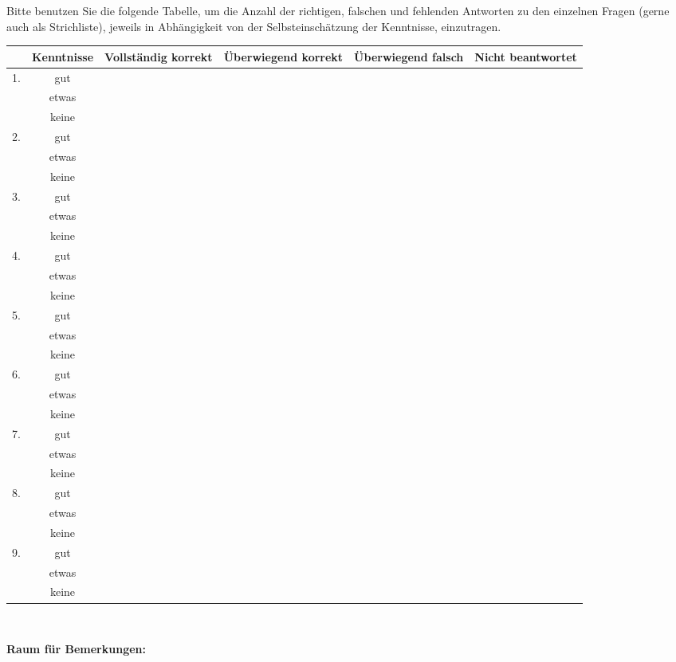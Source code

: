 \documentclass[12pt]{exam}
\begin{document}
\vspace{0.2cm}
\small
Bitte benutzen Sie die folgende Tabelle, um die Anzahl der richtigen, falschen und fehlenden Antworten zu den einzelnen Fragen (gerne auch als Strichliste), jeweils in Abhängigkeit von der Selbsteinschätzung der Kenntnisse, einzutragen. \\
\enlargethispage{5cm}
\begin{tabular}{|l|c|c|c|c|c|}\hline
 & Kenntnisse & Vollständig korrekt & Überwiegend korrekt & Überwiegend falsch & Nicht beantwortet \\\hline
1. &gut&&&&\\\cline{2-6}
   &etwas&&&&\\\cline{2-6}
   &keine&&&&\\\hline
2. &gut&&&&\\\cline{2-6}
   &etwas&&&&\\\cline{2-6}
   &keine&&&&\\\hline
3. &gut&&&&\\\cline{2-6}
   &etwas&&&&\\\cline{2-6}
   &keine&&&&\\\hline
4. &gut&&&&\\\cline{2-6}
   &etwas&&&&\\\cline{2-6}
   &keine&&&&\\\hline
5. &gut&&&&\\\cline{2-6}
   &etwas&&&&\\\cline{2-6}
   &keine&&&&\\\hline
6. &gut&&&&\\\cline{2-6}
   &etwas&&&&\\\cline{2-6}
   &keine&&&&\\\hline
7. &gut&&&&\\\cline{2-6}
   &etwas&&&&\\\cline{2-6}
   &keine&&&&\\\hline
8. &gut&&&&\\\cline{2-6}
   &etwas&&&&\\\cline{2-6}
   &keine&&&&\\\hline
9. &gut&&&&\\\cline{2-6}
   &etwas&&&&\\\cline{2-6}
   &keine&&&&\\\hline
\end{tabular}

${}$

{\bf Raum für Bemerkungen:}

\clearpage
\end{document}
